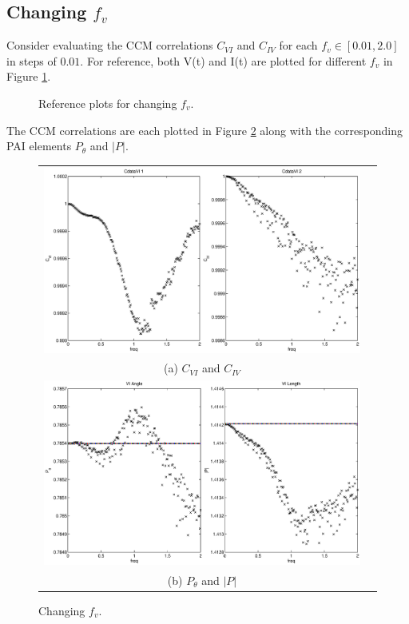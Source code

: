 \documentclass{article}
\begin{document}
\subsection{Changing $f_v$}
Consider evaluating the CCM correlations $C_{VI}$ and $C_{IV}$ for each $f_v\in[0.01,2.0]$ in steps of $0.01$.  For reference, both V(t) and I(t) are plotted for different $f_v$ in Figure \ref{fig:fvref}.
\begin{figure}[H]
\caption{Reference plots for changing $f_v$.}
\label{fig:fvref}
\end{figure}

The CCM correlations are each plotted in Figure \ref{fig:fv} along with the corresponding PAI elements $P_\theta$ and $|P|$.
\begin{figure}[H]
\begin{tabular}{cc}
\includegraphics[scale=0.5]{RLcirc_varyV_freq2.eps} \\
(a) $C_{VI}$ and $C_{IV}$ \\[6pt]
\includegraphics[scale=0.5]{RLcirc_varyV_freq.eps} \\
(b) $P_\theta$ and $|P|$ \\[6pt]
\end{tabular}
\caption{Changing $f_v$.}
\label{fig:fv}
\end{figure}
\end{document}

